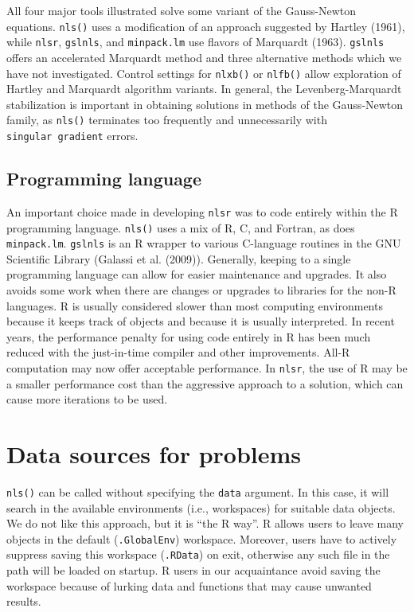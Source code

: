 All four major tools illustrated solve some variant of the Gauss-Newton
equations. \texttt{nls()} uses a modification of an approach suggested by Hartley (1961),
while \texttt{nlsr}, \texttt{gslnls}, and \texttt{minpack.lm} use flavors of Marquardt (1963). \texttt{gslnls}
offers an accelerated Marquardt method and three alternative methods which we
have not investigated.
Control settings for \texttt{nlxb()} or \texttt{nlfb()} allow exploration of Hartley and Marquardt
algorithm variants. In general, the Levenberg-Marquardt stabilization
is important in obtaining
solutions in methods of the Gauss-Newton family, as \texttt{nls()} terminates
too frequently and unnecessarily with \texttt{singular\ gradient} errors.

\hypertarget{programming-language}{%
\subsection{Programming language}\label{programming-language}}

An important choice made in developing \texttt{nlsr} was to code entirely within the R
programming language. \texttt{nls()} uses a mix of R, C, and Fortran, as does \texttt{minpack.lm}.
\texttt{gslnls} is an R wrapper to various C-language routines in the GNU Scientific
Library (Galassi et al. (2009)).
Generally, keeping to a single programming language can allow for
easier maintenance and upgrades. It also avoids some work when there are changes
or upgrades to libraries for the non-R languages.
R is usually considered slower
than most computing environments because it keeps track of objects and
because it is usually interpreted. In recent years, the
performance penalty for using code entirely in R has been much reduced
with the just-in-time compiler and other improvements. All-R computation
may now offer acceptable performance. In \texttt{nlsr}, the use of R may be a
smaller performance cost than the aggressive approach to a solution,
which can cause more iterations to be used.

\hypertarget{data-sources-for-problems}{%
\section{Data sources for problems}\label{data-sources-for-problems}}

\texttt{nls()} can be called without specifying the \texttt{data} argument. In this case, it will
search in the available environments (i.e., workspaces) for suitable data objects.
We do not like this approach, but it is ``the R way''. R allows users to leave many
objects in the default (\texttt{.GlobalEnv}) workspace. Moreover, users have to actively
suppress saving this workspace (\texttt{.RData}) on exit, otherwise any such file in
the path will be loaded on startup. R users in our
acquaintance avoid saving the workspace because of lurking data and
functions that may cause unwanted results.

